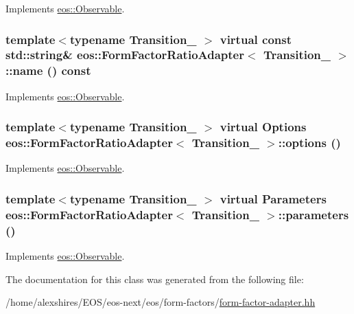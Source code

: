 Implements \hyperlink{classeos_1_1Observable_a8bfd8cc2873e467ac9ae100d029d8c49}{eos::Observable}.\hypertarget{classeos_1_1FormFactorRatioAdapter_a4794ed40d561e939e566f328d16652fe}{
\subsubsection[{name}]{\setlength{\rightskip}{0pt plus 5cm}template$<$typename Transition\_\- $>$ virtual const std::string\& {\bf eos::FormFactorRatioAdapter}$<$ Transition\_\- $>$::name () const}}
\label{classeos_1_1FormFactorRatioAdapter_a4794ed40d561e939e566f328d16652fe}


Implements \hyperlink{classeos_1_1Observable_adfdc8fe469e00adeb464d3b3e4e14236}{eos::Observable}.\hypertarget{classeos_1_1FormFactorRatioAdapter_a4fe52226955dacc174be74224d8b627b}{
\subsubsection[{options}]{\setlength{\rightskip}{0pt plus 5cm}template$<$typename Transition\_\- $>$ virtual {\bf Options} {\bf eos::FormFactorRatioAdapter}$<$ Transition\_\- $>$::options ()}}
\label{classeos_1_1FormFactorRatioAdapter_a4fe52226955dacc174be74224d8b627b}


Implements \hyperlink{classeos_1_1Observable_a237cf968a4f46a93e0cc8ba0fdbaceee}{eos::Observable}.\hypertarget{classeos_1_1FormFactorRatioAdapter_a7146382f5bfc1c2b59119e844a6201a6}{
\subsubsection[{parameters}]{\setlength{\rightskip}{0pt plus 5cm}template$<$typename Transition\_\- $>$ virtual {\bf Parameters} {\bf eos::FormFactorRatioAdapter}$<$ Transition\_\- $>$::parameters ()}}
\label{classeos_1_1FormFactorRatioAdapter_a7146382f5bfc1c2b59119e844a6201a6}


Implements \hyperlink{classeos_1_1Observable_a233852d22f287944b8bbf4da803289b1}{eos::Observable}.

The documentation for this class was generated from the following file:\begin{DoxyCompactItemize}
\item 
/home/alexshires/EOS/eos-\/next/eos/form-\/factors/\hyperlink{form-factor-adapter_8hh}{form-\/factor-\/adapter.hh}\end{DoxyCompactItemize}
